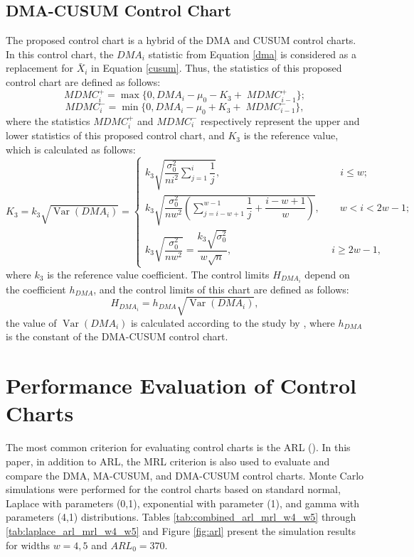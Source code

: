 \documentclass[twoside]{article}
\begin{document}
\subsection{DMA-CUSUM Control Chart}
\vspace{-0.2cm}
The proposed control chart is a hybrid of the DMA and CUSUM control charts. In this control chart, the $DMA_i$ statistic from Equation \eqref{dma} is considered as a replacement for $\bar{X}_i$ in Equation \eqref{cusum}. Thus, the statistics of this proposed control chart are defined as follows:
\begin{equation*}
MDMC_i^+ = \max\{0,  DMA_i - \mu_0 - K_3 +\; MDMC_{i-1}^+ \};
\end{equation*}
\begin{equation*}
MDMC_i^- = \min\{0,  DMA_i - \mu_0 + K_3 + \; MDMC_{i-1}^- \},
\end{equation*}
where the statistics $MDMC_i^+$ and $MDMC_i^-$ respectively represent the upper and lower statistics of this proposed control chart, and $K_3$ is the reference value, which is calculated as follows:
\begin{equation*}
K_3 = k_3 \sqrt{\operatorname{Var}(DMA_i)} = 
\begin{cases}
k_3 \sqrt{\dfrac{\sigma^2_0}{n i^2} \displaystyle\sum_{j=1}^{i} \dfrac{1}{j}}, \qquad \qquad \qquad \qquad \qquad \qquad i \le w; \\[20pt]
k_3 \sqrt{\dfrac{\sigma^2_0}{n w^2} \left( \displaystyle\sum_{j=i-w+1}^{w-1} \dfrac{1}{j} + \dfrac{i-w+1}{w} \right)},  \qquad w < i < 2w-1; \\[20pt]
k_3 \sqrt{\dfrac{\sigma^2_0}{n w^2}} = \dfrac{k_3 \sqrt{\sigma^2_0}}{w \sqrt{n}},\qquad \qquad \qquad \qquad \qquad i \ge 2w-1,
\end{cases}
\end{equation*}
 where $k_3$ is the reference value coefficient. The control limits $H_{DMA_i}$ depend on the coefficient $h_{DMA}$, and the control limits of this chart are defined as follows:
\begin{equation*}
H_{DMA_i} = h_{DMA} \sqrt{\operatorname{Var}(DMA_i)},
\end{equation*}
the value of $\operatorname{Var}(DMA_i)$ is calculated according to the study by \cite{khoo2008}, where $h_{DMA}$ is the constant of the DMA-CUSUM control chart.
\vspace{-0.6cm}
\section{Performance Evaluation of Control Charts}
\vspace{-0.2cm}
The most common criterion for evaluating control charts is the ARL (\cite{Montgomery2013}). In this paper, in addition to ARL, the MRL criterion is also used to evaluate and compare the DMA, MA-CUSUM, and DMA-CUSUM control charts. Monte Carlo simulations  were performed for the control charts based on standard normal, Laplace with parameters (0,1), exponential with parameter (1), and gamma with parameters (4,1) distributions. Tables \ref{tab:combined_arl_mrl_w4_w5} through \ref{tab:laplace_arl_mrl_w4_w5} and Figure \ref{fig:arl} present the simulation results for widths $w = 4, 5$ and $ARL_0 = 370$.
\end{document}
